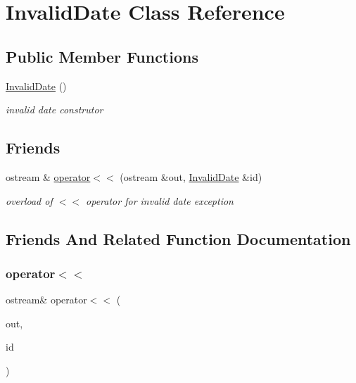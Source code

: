 \hypertarget{class_invalid_date}{}\section{Invalid\+Date Class Reference}
\label{class_invalid_date}
\subsection*{Public Member Functions}
\begin{DoxyCompactItemize}
\item 
\hypertarget{class_invalid_date_a75456d6d28f8d8ab60772e93652f9e8b}{}\label{class_invalid_date_a75456d6d28f8d8ab60772e93652f9e8b} 
\hyperlink{class_invalid_date_a75456d6d28f8d8ab60772e93652f9e8b}{Invalid\+Date} ()
\begin{DoxyCompactList}\small\item\em invalid date construtor \end{DoxyCompactList}\end{DoxyCompactItemize}
\subsection*{Friends}
\begin{DoxyCompactItemize}
\item 
ostream \& \hyperlink{class_invalid_date_a9ef99a3039876284251a004f3727791c}{operator$<$$<$} (ostream \&out, \hyperlink{class_invalid_date}{Invalid\+Date} \&id)
\begin{DoxyCompactList}\small\item\em overload of $<$$<$ operator for invalid date exception \end{DoxyCompactList}\end{DoxyCompactItemize}


\subsection{Friends And Related Function Documentation}
\hypertarget{class_invalid_date_a9ef99a3039876284251a004f3727791c}{}\label{class_invalid_date_a9ef99a3039876284251a004f3727791c} 
\subsubsection{\texorpdfstring{operator$<$$<$}{operator<<}}
{\footnotesize\ttfamily ostream\& operator$<$$<$ (\begin{DoxyParamCaption}\item[{ostream \&}]{out,  }\item[{\hyperlink{class_invalid_date}{Invalid\+Date} \&}]{id }\end{DoxyParamCaption})\hspace{0.3cm}{\ttfamily [friend]}}



